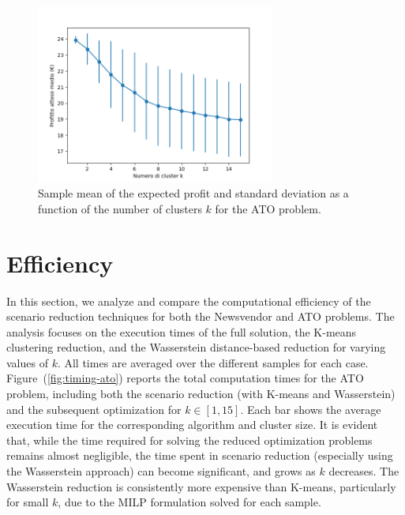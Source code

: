 \documentclass[a4paper,12pt]{article}
\begin{document}
	\begin{figure}[H]
		\centering
		\includegraphics[width=0.7\textwidth]{../immagini/rendimentoWass_ato.png}
		\caption{Sample mean of the expected profit and standard deviation as a function of the number of clusters $k$ for the ATO problem.}
		\label{fig:rendimentoWass-ato}
	\end{figure}
	
	\newpage	
	\section{Efficiency}
	
	In this section, we analyze and compare the computational efficiency of the scenario reduction techniques for both the Newsvendor and ATO problems. The analysis focuses on the execution times of the full solution, the K-means clustering reduction, and the Wasserstein distance-based reduction for varying values of $k$. All times are averaged over the different samples for each case.\\
	
	\noindent Figure~(\ref{fig:timing-ato}) reports the total computation times for the ATO problem, including both the scenario reduction (with K-means and Wasserstein) and the subsequent optimization for $k \in [1,15]$. Each bar shows the average execution time for the corresponding algorithm and cluster size. It is evident that, while the time required for solving the reduced optimization problems remains almost negligible, the time spent in scenario reduction (especially using the Wasserstein approach) can become significant, and grows as $k$ decreases. The Wasserstein reduction is consistently more expensive than K-means, particularly for small $k$, due to the MILP formulation solved for each sample.
	
\end{document}
